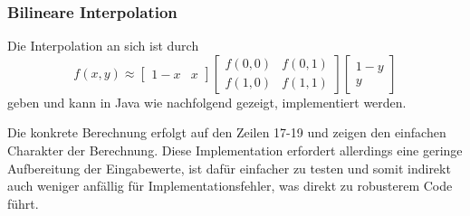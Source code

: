 \subsubsection{Bilineare Interpolation}\label{sss:bilinearinterpolation}
Die Interpolation an sich ist durch 
\begin{equation}
f(x,y) \approx \begin{bmatrix} 1-x & x \end{bmatrix} \begin{bmatrix}
f(0,0) & f(0,1) \\ f(1,0) & f(1,1) \end{bmatrix} \begin{bmatrix} 1 - y
\\ y \end{bmatrix}
\label{eq:bilineareinterpolation}
\end{equation}
geben und kann in Java wie nachfolgend gezeigt, implementiert werden.

 
Die konkrete Berechnung erfolgt auf den Zeilen 17-19 und zeigen den
einfachen Charakter der Berechnung. Diese Implementation erfordert
allerdings eine geringe Aufbereitung der Eingabewerte, ist dafür
einfacher zu testen und somit indirekt auch weniger anfällig für
Implementationsfehler, was direkt zu robusterem Code führt.

